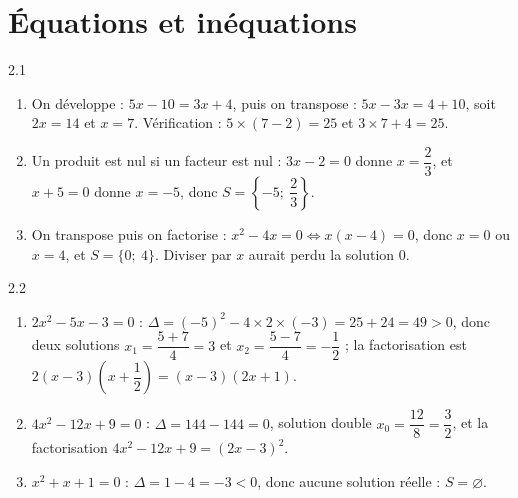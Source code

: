 \clearpage
\chapter{Équations et inéquations}

\begin{corrige}{2.1}
\begin{enumerate}
\item On développe : $5x - 10 = 3x + 4$, puis on transpose : $5x - 3x = 4 + 10$, soit $2x = 14$ et $x = 7$. Vérification : $5 \times (7 - 2) = 25$ et $3 \times 7 + 4 = 25$.
\item Un produit est nul si un facteur est nul : $3x - 2 = 0$ donne $x = \dfrac{2}{3}$, et $x + 5 = 0$ donne $x = -5$, donc $S = \left\{-5;\ \dfrac{2}{3}\right\}$.
\item On transpose puis on factorise : $x^{2} - 4x = 0 \Longleftrightarrow x(x - 4) = 0$, donc $x = 0$ ou $x = 4$, et $S = \{0;\ 4\}$. Diviser par $x$ aurait perdu la solution $0$.
\end{enumerate}
\end{corrige}

\begin{corrige}{2.2}
\begin{enumerate}
\item $2x^{2} - 5x - 3 = 0$ : $\Delta = (-5)^{2} - 4 \times 2 \times (-3) = 25 + 24 = 49 > 0$, donc deux solutions $x_{1} = \dfrac{5 + 7}{4} = 3$ et $x_{2} = \dfrac{5 - 7}{4} = -\dfrac{1}{2}$ ; la factorisation est $2(x - 3)\left(x + \dfrac{1}{2}\right) = (x - 3)(2x + 1)$.
\item $4x^{2} - 12x + 9 = 0$ : $\Delta = 144 - 144 = 0$, solution double $x_{0} = \dfrac{12}{8} = \dfrac{3}{2}$, et la factorisation $4x^{2} - 12x + 9 = (2x - 3)^{2}$.
\item $x^{2} + x + 1 = 0$ : $\Delta = 1 - 4 = -3 < 0$, donc aucune solution réelle : $S = \varnothing$.
\end{enumerate}
\end{corrige}

